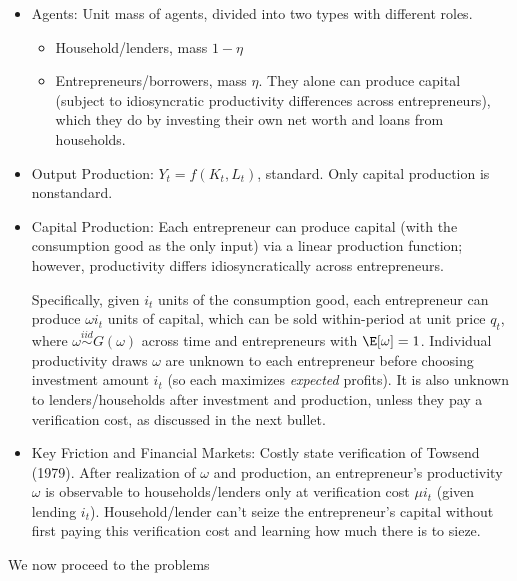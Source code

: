 \documentclass[12pt]{article}
\theoremstyle{plain}
\theoremstyle{definition}
\theoremstyle{remark}
\newcommand{\iid}{\overset{iid}{\sim}}
\begin{document}
\begin{itemize}
  \item Agents: Unit mass of agents, divided into two types with
    different roles.
    \begin{itemize}
      \item Household/lenders, mass $1-\eta$
      \item Entrepreneurs/borrowers, mass $\eta$.
        They alone can produce capital (subject to idiosyncratic
        productivity differences across entrepreneurs), which they do by
        investing their own net worth and loans from households.
    \end{itemize}
  \item Output Production: $Y_t=f(K_t,L_t)$, standard.
    Only capital production is nonstandard.
  \item Capital Production:
    Each entrepreneur can produce capital (with the consumption good as
    the only input) via a linear production function; however,
    productivity differs idiosyncratically across entrepreneurs.

    Specifically, given $i_t$ units of the consumption good, each
    entrepreneur can produce $\omega i_t$ units of capital, which can be
    sold within-period at unit price $q_t$, where $\omega\iid G(\omega)$
    across time and entrepreneurs with $\E[\omega]=1$.
    Individual productivity draws $\omega$ are unknown to each
    entrepreneur before choosing investment amount $i_t$ (so each
    maximizes \emph{expected} profits).
    It is also unknown to lenders/households after investment and
    production, unless they pay a verification cost, as discussed in the
    next bullet.

  \item
    Key Friction and Financial Markets:
    Costly state verification of Towsend (1979).
    After realization of $\omega$ and production, an entrepreneur's
    productivity $\omega$ is observable to households/lenders only at
    verification cost $\mu i_t$ (given lending $i_t$).
    Household/lender can't seize the entrepreneur's capital without
    first paying this verification cost and learning how much there is
    to sieze.
\end{itemize}
\clearpage
We now proceed to the problems
\end{document}
